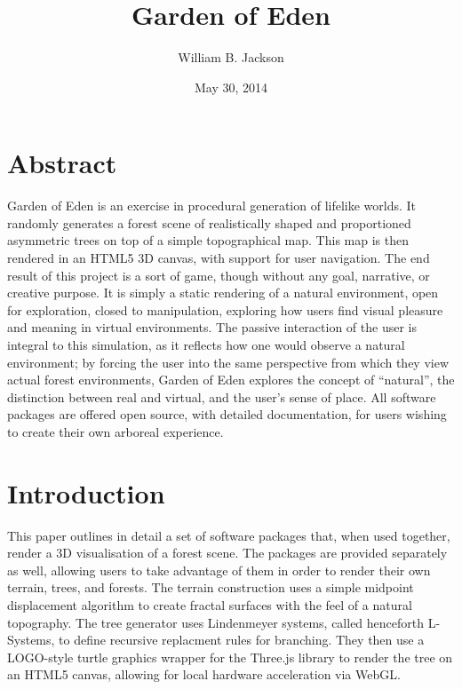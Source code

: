 \documentclass{article}
\title{Garden of Eden}
\author{William B. Jackson}
\date{May 30, 2014}
\newcommand{\tab}{\hspace*{2em}}
\begin{document}
    \maketitle

    \setcounter{tocdepth}{2}
    \tableofcontents



    \section{Abstract} %
    \tab Garden of Eden is an exercise in procedural generation of lifelike worlds. It randomly
generates a forest scene of realistically shaped and proportioned asymmetric trees on top of a
simple topographical map. This map is then rendered in an HTML5 3D canvas, with support for user
navigation. The end result of this project is a sort of game, though without any goal, narrative, or creative purpose.
It is simply a static rendering of a natural environment, open for exploration, closed to
manipulation, exploring how users find visual pleasure and meaning in virtual environments. The
passive interaction of the user is integral to this simulation, as it reflects how one would observe a
natural environment; by forcing the user into the same perspective from which they view actual
forest environments, Garden of Eden explores the concept of “natural”, the distinction between
real and virtual, and the user's sense of place. All software packages are offered open source,
with detailed documentation, for users wishing to create their own arboreal experience.
 

    \section{Introduction}
    \tab This paper outlines in detail a set of software packages that, when used together, render
a 3D visualisation of a forest scene. The packages are provided separately as well, allowing users
to take advantage of them in order to render their own terrain, trees, and forests. The terrain
construction uses a simple midpoint displacement algorithm\cite{fournier82} to create fractal
surfaces with the feel of a natural topography. The tree generator uses Lindenmeyer
systems\cite{abp96}, called henceforth L-Systems, to define recursive replacment rules for
branching. They then use a LOGO-style turtle graphics wrapper for the Three.js library to render
the tree on an HTML5 canvas, allowing for local hardware acceleration via WebGL.
\end{document}
